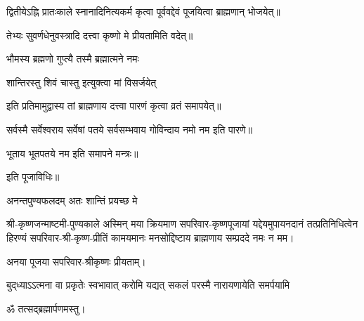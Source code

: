 \begin{center}
द्वितीयेऽह्नि प्रातःकाले स्नानादिनित्यकर्म कृत्वा पूर्ववद्देवं पूजयित्वा ब्राह्मणान् भोजयेत्॥

तेभ्यः सुवर्णधेनुवस्त्रादि दत्त्वा कृष्णो मे प्रीयतामिति वदेत्॥

{भौमस्य ब्रह्मणो गुप्त्यै तस्मै ब्रह्मात्मने नमः}

{शान्तिरस्तु शिवं चास्तु इत्युक्त्वा मां विसर्जयेत्}

इति प्रतिमामुद्वास्य तां ब्राह्मणाय दत्त्वा पारणं कृत्वा व्रतं समापयेत्॥

सर्वस्मै सर्वेश्वराय सर्वेषां पतये सर्वसम्भवाय गोविन्दाय नमो नम इति पारणे॥

भूताय भूतपतये नम इति समापने मन्त्रः॥

इति पूजाविधिः॥

{अनन्तपुण्यफलदम् अतः शान्तिं प्रयच्छ मे}

श्री-कृष्णजन्माष्टमी-पुण्यकाले अस्मिन् मया क्रियमाण सपरिवार-कृष्णपूजायां यद्देयमुपायनदानं तत्प्रतिनिधित्वेन हिरण्यं सपरिवार-श्री-कृष्ण-प्रीतिं कामयमानः मनसोद्दिष्टाय ब्राह्मणाय सम्प्रददे नमः न मम। 

अनया पूजया सपरिवार-श्रीकृष्णः प्रीयताम्। 
 
{बुद्‌ध्याऽऽत्मना वा प्रकृतेः स्वभावात्}
{करोमि यद्यत् सकलं परस्मै}
{नारायणायेति समर्पयामि}

ॐ तत्सद्ब्रह्मार्पणमस्तु।

\end{center}





\closesection

